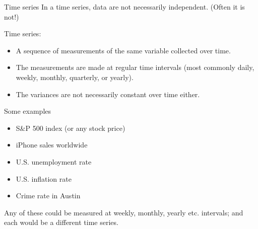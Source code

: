 \documentclass{beamer}\usepackage[]{graphicx}\usepackage[]{color}
\makeatletter
\newcommand{\hlnum}[1]{\textcolor[rgb]{0.824,0.412,0.118}{#1}}%
\newcommand{\hlcom}[1]{\textcolor[rgb]{0.824,0.706,0.549}{#1}}%
\newcommand{\hlopt}[1]{\textcolor[rgb]{1,0.894,0.769}{#1}}%
\newcommand{\hlstd}[1]{\textcolor[rgb]{1,0.894,0.769}{#1}}%
\newcommand{\hlkwb}[1]{\textcolor[rgb]{0.804,0.776,0.451}{#1}}%
\newcommand{\hlkwc}[1]{\textcolor[rgb]{0.78,0.941,0.545}{#1}}%
\newcommand{\hlkwd}[1]{\textcolor[rgb]{1,0.78,0.769}{#1}}%
\newenvironment{kframe}{%
 \def\at@end@of@kframe{}%
 \ifinner\ifhmode%
  \def\at@end@of@kframe{\end{minipage}}%
  \begin{minipage}{\columnwidth}%
 \fi\fi%
 \def\FrameCommand##1{\hskip\@totalleftmargin \hskip-\fboxsep
 \colorbox{shadecolor}{##1}\hskip-\fboxsep
     \hskip-\linewidth \hskip-\@totalleftmargin \hskip\columnwidth}%
 \MakeFramed {\advance\hsize-\width
   \@totalleftmargin\z@ \linewidth\hsize
   \@setminipage}}%
 {\par\unskip\endMakeFramed%
 \at@end@of@kframe}
\newenvironment{knitrout}{}{} %
\makeatother
\begin{document}
\begin{darkframes}
    
    
    
    \begin{frame}{Time series}
      In a \alert{time series,} data are not necessarily independent. (Often it is not!) \pause
      \bigskip
      
      Time series:
      \begin{itemize}
        \item A sequence of measurements of the same variable collected over time.
        \item The measurements are made at regular time intervals (most commonly daily, weekly, monthly, quarterly, or yearly).
        \item The variances are not necessarily constant over time either.
      \end{itemize}    
    \end{frame}
    
    
    
    \begin{frame}{Some examples}
      \begin{itemize}
        \item S\&P 500 index (or any stock price)
        \item iPhone sales worldwide
        \item U.S. unemployment rate
        \item U.S. inflation rate
        \item Crime rate in Austin
      \end{itemize} \pause
      \bigskip
      Any of these could be measured at weekly, monthly, yearly etc. intervals; and each would be a different time series.
    \end{frame}
  
  
\end{darkframes}
\end{document}
